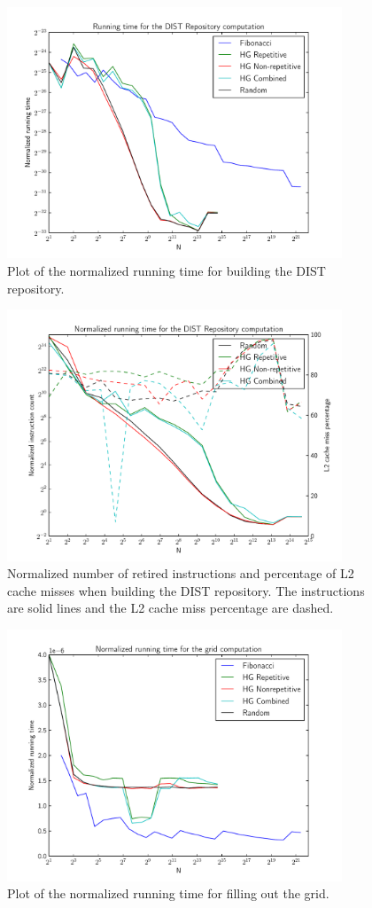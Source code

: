 \documentclass[twoside,11pt,openright]{report}
\begin{document}
\begin{figure}[h!]
  \centering
  \includegraphics[width=10cm]{combined/dist_runningtime}
  \caption{Plot of the normalized running time for building the DIST repository.}
  \label{fig:benchmark:dist-repo-time}
\end{figure}

\begin{figure}[h!]
  \centering
  \includegraphics[width=10cm]{combined/dist_runningtime_cpu}
  \caption{Normalized number of retired instructions and percentage of L2 cache misses when building the DIST repository. The instructions are solid lines and the L2 cache miss percentage are dashed.}
  \label{fig:benchmark:dist-repo-cpu}
\end{figure}

\begin{figure}[h!]
  \centering
  \includegraphics[width=10cm]{combined/grid_runningtime}
  \caption{Plot of the normalized running time for filling out the grid.}
  \label{fig:benchmark:fill-grid-time}
\end{figure}
\end{document}

